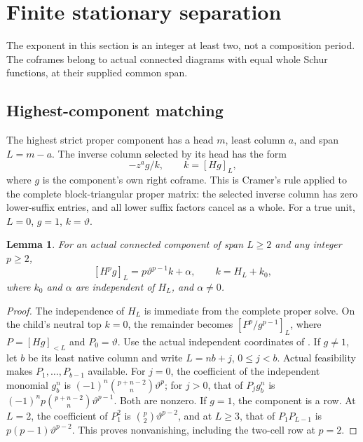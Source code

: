 \documentclass[11pt,a4paper]{amsart}
\numberwithin{equation}{section}
\theoremstyle{plain}
\newtheorem{lemma}[theorem]{Lemma}
\theoremstyle{definition}
\begin{document}
\section{Finite stationary separation}\label{sec:stationary}

The exponent in this section is an integer at least two, not a
composition period.  The coframes belong to actual connected diagrams
with equal whole Schur functions, at their supplied common span.

\subsection{Highest-component matching}

The highest strict proper component has a head \(m\), least column \(a\),
and span \(L=m-a\).  The inverse column selected by its head has the form
\begin{equation}\label{sc:component-column}
 -z^ag/k,
 \qquad k=[Hg]_L,
\end{equation}
where \(g\) is the component's own right coframe.  This is Cramer's
rule applied to the complete block-triangular proper matrix: the
selected inverse column has zero lower-suffix entries, and all lower
suffix factors cancel as a whole.  For a true unit, \(L=0\), \(g=1\), \(k=\vartheta\).

\begin{lemma}\label{sc:component-remainder}
For an actual connected component of span \(L\ge2\) and any integer
\(p\ge2\),
\begin{equation}\label{sc:nonzero-remainder}
 [H^pg]_L=p\vartheta^{p-1}k+\alpha,
 \qquad k=H_L+k_0,
\end{equation}
where \(k_0\) and \(\alpha\) are independent of \(H_L\), and \(\alpha\ne0\).
\end{lemma}
\begin{proof}
The independence of \(H_L\) is immediate from the complete proper
solve.  On the child's neutral top \(k=0\), the remainder becomes
\([P^p/g^{p-1}]_L\), where \(P=[Hg]_{<L}\) and \(P_0=\vartheta\).
Use the actual independent coordinates of .
If \(g\ne1\), let \(b\) be its least native column and write
\(L=nb+j\), \(0\le j<b\).  Actual feasibility makes
\(P_1,\ldots,P_{b-1}\) available.  For \(j=0\), the coefficient of
the independent monomial \(g_b^n\) is
\((-1)^n\binom{p+n-2}{n}\vartheta^p\); for \(j>0\), that of
\(P_jg_b^n\) is
\((-1)^np\binom{p+n-2}{n}\vartheta^{p-1}\).  Both are nonzero.
If \(g=1\), the component is a row.  At \(L=2\), the coefficient of
\(P_1^2\) is \(\binom p2\vartheta^{p-2}\), and at \(L\ge3\), that of
\(P_1P_{L-1}\) is \(p(p-1)\vartheta^{p-2}\).  This proves nonvanishing,
including the two-cell row at \(p=2\).
\end{proof}
\end{document}
